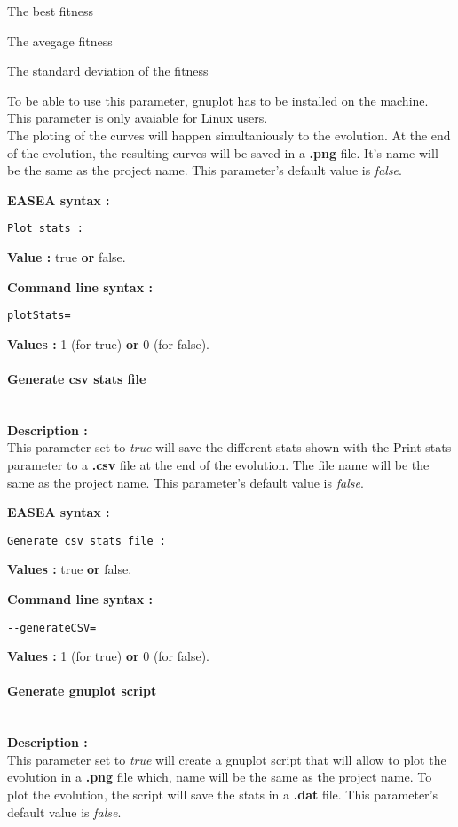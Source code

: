 \documentclass{book}
\begin{document}
The best fitness

The avegage fitness

The standard deviation of the fitness

To be able to use this parameter, gnuplot has to be installed on the
machine. This parameter is only avaiable for Linux users.\\The ploting
of the curves will happen simultaniously to the evolution. At the end of
the evolution, the resulting curves will be saved in a \textbf{.png}
file. It's name will be the same as the project name. This parameter's
default value is \emph{false}.

\textbf{EASEA syntax :}

\texttt{Plot~stats~:}

\textbf{Value :} true \textbf{or} false.

\textbf{Command line syntax :}

\texttt{plotStats=}

\textbf{Values :} 1 (for true) \textbf{or} 0 (for false).

\paragraph{Generate csv stats file}\label{generate-csv-stats-file}
~\\

\textbf{Description :}\\This parameter set to \emph{true} will save the
different stats shown with the
Print stats parameter to a
\textbf{.csv} file at the end of the evolution. The file name will be
the same as the project name. This parameter's default value is
\emph{false}.

\textbf{EASEA syntax :}

\texttt{Generate~csv~stats~file~:}

\textbf{Values :} true \textbf{or} false.

\textbf{Command line syntax :}

\texttt{-{}-generateCSV=}

\textbf{Values :} 1 (for true) \textbf{or} 0 (for false).

\paragraph{Generate gnuplot script}\label{generate-gnuplot-script}
~\\

\textbf{Description :}\\This parameter set to \emph{true} will create a
gnuplot script that will allow to plot the evolution in a \textbf{.png}
file which, name will be the same as the project name. To plot the
evolution, the script will save the stats in a \textbf{.dat} file. This
parameter's default value is \emph{false}.
\end{document}
